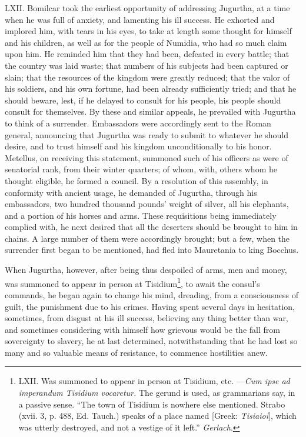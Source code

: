 LXII. Bomilcar took the earliest opportunity of addressing Jugurtha,
at a time when he was full of anxiety, and lamenting his ill success.
He exhorted and implored him, with tears in his eyes, to take at
length some thought for himself and his children, as well as for the
people of Numidia, who had so much claim upon him. He reminded him
that they had been, defeated in every battle; that the country was
laid waste; that numbers of his subjects had been captured or slain;
that the resources of the kingdom were greatly reduced; that the valor
of his soldiers, and his own fortune, had been already sufficiently
tried; and that he should beware, lest, if he delayed to consult for
his people, his people should consult for themselves. By these and
similar appeals, he prevailed with Jugurtha to think of a surrender.
Embassadors were accordingly sent to the Roman general, announcing
that Jugurtha was ready to submit to whatever he should desire, and to
trust himself and his kingdom unconditionally to his honor. Metellus,
on receiving this statement, summoned such of his officers as were of
senatorial rank, from their winter quarters; of whom, with, others
whom he thought eligible, he formed a council. By a resolution of this
assembly, in conformity with ancient usage, he demanded of Jugurtha,
through his embassadors, two hundred thousand pounds' weight of
silver, all his elephants, and a portion of his horses and arms. These
requisitions being immediately complied with, he next desired that all
the deserters should be brought to him in chains. A large number of
them were accordingly brought; but a few, when the surrender first
began to be mentioned, had fled into Mauretania to king Bocchus.

When Jugurtha, however, after being thus despoiled of arms, men and
money, was summoned to appear in person at Tisidium\footnote{LXII. Was summoned to appear in person at Tisidium, etc.
—\emph{Cum ipse ad imperandum Tisidium vocaretur.} The gerund is used, as
grammarians say, in a passive sense. ``The town of Tisidium is nowhere
else mentioned. Strabo (xvii. 3, p. 488, Ed. Tauch.) speaks of a place
named [Greek: \emph{Tisiaioi}], which was utterly destroyed, and not a
vestige of it left.'' \emph{Gerlach}.}, to await the
consul's commands, he began again to change his mind, dreading, from a
consciousness of guilt, the punishment due to his crimes. Having spent
several days in hesitation, sometimes, from disgust at his ill
success, believing any thing better than war, and sometimes
considering with himself how grievous would be the fall from
sovereignty to slavery, he at last determined, notwithstanding that he
had lost so many and so valuable means of resistance, to commence
hostilities anew.

